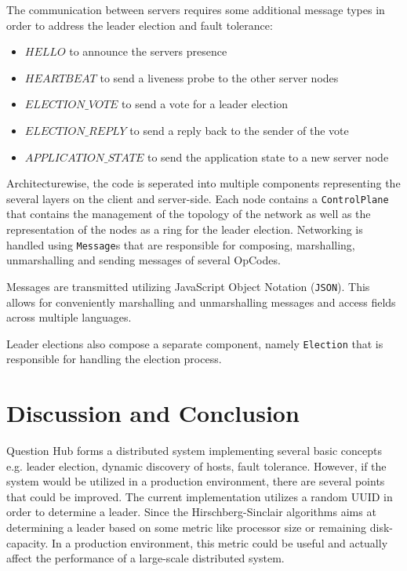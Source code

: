 \documentclass[runningheads]{llncs}
\begin{document}
The communication between servers requires some additional message types in
order to address the leader election and fault tolerance:

\begin{itemize}
    \item \textbf{$HELLO$} to announce the servers presence
    \item \textbf{$HEARTBEAT$} to send a liveness probe to the other server nodes
    \item \textbf{$ELECTION\_VOTE$} to send a vote for a leader election
    \item \textbf{$ELECTION\_REPLY$} to send a reply back to the sender of the vote
    \item \textbf{$APPLICATION\_STATE$} to send the application state to a new server node
\end{itemize}

Architecturewise, the code is seperated into multiple components representing
the several layers on the client and server-side. Each node contains a
\texttt{ControlPlane} that contains the management of the topology of the
network as well as the representation of the nodes as a ring for the leader
election. Networking is handled using \texttt{Message}s that are responsible
for composing, marshalling, unmarshalling and sending messages of several
OpCodes.

Messages are transmitted utilizing JavaScript Object Notation (\texttt{JSON}).
This allows for conveniently marshalling and unmarshalling messages and access
fields across multiple languages. 

Leader elections also compose a separate component, namely \texttt{Election}
that is responsible for handling the election process.

\section{Discussion and Conclusion}

Question Hub forms a distributed system implementing several basic concepts e.g. leader election, dynamic discovery of hosts, fault tolerance.
However, if the system would be utilized in a production environment, there are several points that could be improved. The current implementation utilizes
a random UUID in order to determine a leader. Since the Hirschberg-Sinclair algorithms aims at determining a leader based on some metric like processor size or remaining disk-capacity.
In a production environment, this metric could be useful and actually affect  the performance of a large-scale distributed system. 
\end{document}
